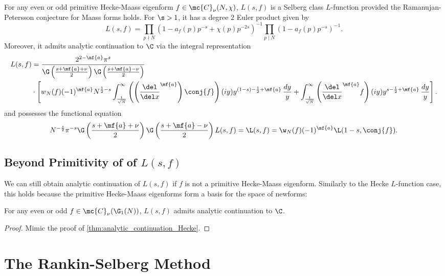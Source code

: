       \begin{theorem}\label{equ:thm:primitive_Hecke-Maass_Selberg}
        For any even or odd primitive Hecke-Maass eigenform $f \in \mc{C}_{\nu}(N,\chi)$, $L(s,f)$ is a Selberg class $L$-function provided the Ramanujan-Petersson conjecture for Maass forms holds. For $\s > 1$, it has a degree $2$ Euler product given by 
        \[
          L(s,f) = \prod_{p \nmid N}(1-a_{f}(p)p^{-s}+\chi(p)p^{-2s})^{-1}\prod_{p \mid N}(1-a_{f}(p)p^{-s})^{-1}.
        \]
        Moreover, it admits analytic continuation to $\C$ via the integral representation
        \begin{align*}
          L(s,f) &= \frac{2^{2-\mf{a}}\pi^{s}}{\G\left(\frac{s+\mf{a}+\nu}{2}\right)\G\left(\frac{s+\mf{a}-\nu}{2}\right)} \\
          &\cdot \left[w_{N}(f)(-1)^{\mf{a}}N^{\frac{1}{2}-s}\int_{\frac{1}{\sqrt{N}}}^{\infty}\left(\left(\frac{\del}{\del x}^{\mf{a}}\right)\conj{f}\right)(iy)y^{(1-s)-\frac{1}{2}+\mf{a}}\,\frac{dy}{y}+\int_{\frac{1}{\sqrt{N}}}^{\infty}\left(\frac{\del}{\del x}^{\mf{a}}f\right)(iy)y^{s-\frac{1}{2}+\mf{a}}\,\frac{dy}{y}\right].
        \end{align*}
        and possesses the functional equation
        \[
          N^{-\frac{s}{2}}\pi^{-s}\G\left(\frac{s+\mf{a}+\nu}{2}\right)\G\left(\frac{s+\mf{a}-\nu}{2}\right)L(s,f) = \L(s,f) = \w_{N}(f)(-1)^{\mf{a}}\L(1-s,\conj{f}).
        \]
      \end{theorem}
    \subsection*{Beyond Primitivity of of \texorpdfstring{$L(s,f)$}{L(s,f)}}
      We can still obtain analytic continuation of $L(s,f)$ if $f$ is not a primitive Hecke-Maass eigenform. Similarly to the Hecke $L$-function case, this holds because the primitive Hecke-Maass eigenforms form a basis for the space of newforms:

      \begin{theorem}\label{thm:analytic_continuation_Hecke-Maass}
        For any even or odd $f \in \mc{C}_{\nu}(\G_{1}(N))$, $L(s,f)$ admits analytic continuation to $\C$.
      \end{theorem}
      \begin{proof}
        Mimic the proof of \cref{thm:analytic_continuation_Hecke}.
      \end{proof}
  \section{The Rankin-Selberg Method}
